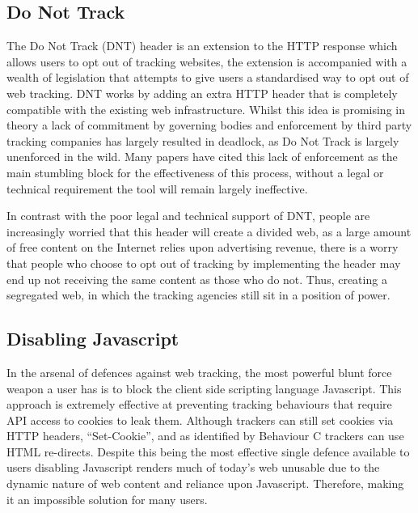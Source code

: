 \documentclass{article}
\begin{document}
\subsection{Do Not Track}
The Do Not Track (DNT) header is an extension to the HTTP response which allows users to opt out of tracking websites, the extension is accompanied with a wealth of legislation that attempts to give users a standardised way to opt out of web tracking. DNT works by adding an extra HTTP header that is completely compatible with the existing web infrastructure. Whilst this idea is promising in theory a lack of commitment by governing bodies and enforcement by third party tracking companies has largely resulted in deadlock, as Do Not Track is largely unenforced in the wild. Many papers have cited this lack of enforcement as the main stumbling block for the effectiveness of this process, without a legal or technical requirement the tool will remain largely ineffective. \newline

In contrast with the poor legal and technical support of DNT, people are increasingly worried that this header will create a divided web, as a large amount of free content on the Internet relies upon advertising revenue, there is a worry that people who choose to opt out of tracking by implementing the header may end up not receiving the same content as those who do not. Thus, creating a segregated web, in which the tracking agencies still sit in a position of power. 

\subsection{Disabling Javascript}
In the arsenal of defences against web tracking, the most powerful blunt force weapon a user has is to block the client side scripting language Javascript. This approach is extremely effective at preventing tracking behaviours that require API access to cookies to leak them. Although trackers can still set cookies via HTTP headers, ``Set-Cookie'', and as identified by \parencite{roesner} Behaviour C trackers can use HTML re-directs. Despite this being the most effective single defence available to users disabling Javascript renders much of today's web unusable due to the dynamic nature of web content and reliance upon Javascript. Therefore, making it an impossible solution for many users. 
\end{document}
